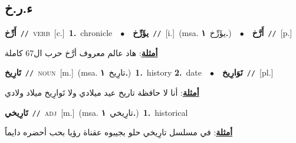 \documentclass[10pt,a4paper,twoside]{article} %
\begin{document}
\begin{multicols}{2}
{{{{{{{{{{{{{{\vspace{-3mm}
\subsection*{\color{blue}\foreignlanguage{arabic}{ء.ر.خ}\color{blue}{}} 

{\setlength\topsep{0pt}\textbf{\foreignlanguage{arabic}{أَرِّخ}}\ {\color{gray}\texttt{//}\color{black}}\ \textsc{verb}\ [c.]\ \textbf{1.}~chronicle\ \ $\bullet$\ \ \setlength\topsep{0pt}\textbf{\foreignlanguage{arabic}{يؤَرِّخ}}\ {\color{gray}\texttt{//}\color{black}}\ [i.]\ \color{gray}(msa. \foreignlanguage{arabic}{يؤَرِّخ}~\foreignlanguage{arabic}{\textbf{١.}})\color{black}\ \ $\bullet$\ \ \setlength\topsep{0pt}\textbf{\foreignlanguage{arabic}{أَرَّخ}}\ {\color{gray}\texttt{//}\color{black}}\ [p.]\  \begin{flushright}\color{gray}\foreignlanguage{arabic}{\textbf{\underline{\foreignlanguage{arabic}{أمثلة}}}: هاد عالم معروف أرَّخ حرب ال67 كاملة}\end{flushright}\color{black}} \vspace{2mm}

{\setlength\topsep{0pt}\textbf{\foreignlanguage{arabic}{تَارِيخ}}\ {\color{gray}\texttt{//}\color{black}}\ \textsc{noun}\ [m.]\ \color{gray}(msa. \foreignlanguage{arabic}{تارِيخ}~\foreignlanguage{arabic}{\textbf{١.}})\color{black}\ \textbf{1.}~history  \textbf{2.}~date\ \ $\bullet$\ \ \setlength\topsep{0pt}\textbf{\foreignlanguage{arabic}{تَوَارِيخ}}\ {\color{gray}\texttt{//}\color{black}}\ [pl.]\  \begin{flushright}\color{gray}\foreignlanguage{arabic}{\textbf{\underline{\foreignlanguage{arabic}{أمثلة}}}: أنا لا حافظة تاريخ عيد ميلادي ولا تَوارِيخ ميلاد ولادي}\end{flushright}\color{black}} \vspace{2mm}

{\setlength\topsep{0pt}\textbf{\foreignlanguage{arabic}{تَارِيخي}}\ {\color{gray}\texttt{//}\color{black}}\ \textsc{adj}\ [m.]\ \color{gray}(msa. \foreignlanguage{arabic}{تارِيخي}~\foreignlanguage{arabic}{\textbf{١.}})\color{black}\ \textbf{1.}~historical\  \begin{flushright}\color{gray}\foreignlanguage{arabic}{\textbf{\underline{\foreignlanguage{arabic}{أمثلة}}}: في مسلسل تارِيخي حلو بجيبوه عقناة رؤيا بحب أحضره دايماً}\end{flushright}\color{black}} \vspace{2mm}

}}}}}}}}}}}}}}
\end{multicols}
\end{document}
